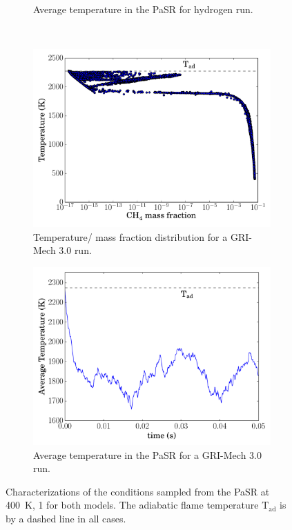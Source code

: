 \documentclass[preprint,review,11pt]{elsarticle}
\begin{document}
\begin{figure}[htbp]
\begin{subfigure}{0.48\textwidth}
      \caption{Average temperature in the PaSR for hydrogen run.}
  \end{subfigure}\\
  \begin{subfigure}{0.48\textwidth}
      \includegraphics[width=\linewidth]{CH4_pasr_dist.pdf}
      \caption{Temperature\slash {} mass fraction distribution for a GRI-Mech 3.0 run.}
  \end{subfigure}
  \hfill
  \begin{subfigure}{0.48\textwidth}
      \includegraphics[width=\linewidth]{CH4_pasr_tbar.pdf}
      \caption{Average temperature in the PaSR for a GRI-Mech 3.0 run.}
  \end{subfigure}
  \caption{Characterizations of the conditions sampled from the PaSR at \SI{400}{\kelvin}, \SI{1}{\atm} for both models.
  The adiabatic flame temperature $\text{T}_{\text{ad}}$ is by a dashed line in all cases.}
  \label{F:pasr_characterization}
\end{figure}
\end{document}
